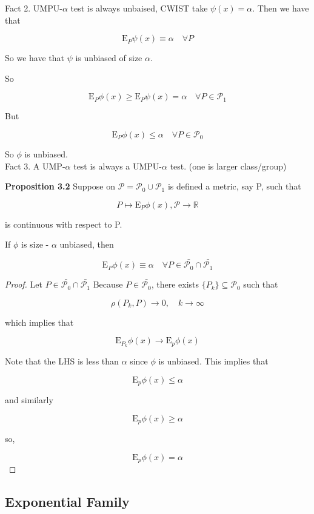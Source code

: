 \documentclass[11pt,fleqn]{book} %
\newcommand{\E}{\mathrm{E}}
\begin{document}
Fact 2. UMPU-$\alpha$ test is always unbaised, CWIST take $\psi(x) = \alpha$. Then we have that 

		$$\E_P \psi(x) \equiv \alpha \quad \forall P $$

So we have that $\psi $ is unbiased of size $\alpha$. 

So 		

		$$\E_P \phi(x) \geq \E_P \psi(x) = \alpha \quad \forall P \in \mathcal{P}_1 $$ 

But 

		$$\E_P \phi(x) \leq \alpha \quad \forall  P \in \mathcal{P}_0$$

So $\phi$ is unbiased. \\


Fact 3. A UMP-$\alpha$ test is always a UMPU-$\alpha$ test. (one is larger class/group)

\textbf{Proposition 3.2} Suppose on $\mathcal{P} = \mathcal{P}_0 \cup \mathcal{P}_1$ is defined a metric, say P, such that

		$$P \mapsto \E_P \phi(x), \mathcal{P} \rightarrow \mathbb{R} $$

is continuous with respect to  P. 

If $\phi$ is size - $\alpha$ unbiased, then

		$$\E_P \phi(x) \equiv \alpha \quad \forall P \in \bar{\mathcal{P}_0} \cap \bar{\mathcal{P}_1} $$

	\begin{proof}
		Let $P \in \bar{\mathcal{P}_0} \cap \bar{\mathcal{P}_1}$ Because $P \in \bar{\mathcal{P}_0}$, there exists $\{P_k\} \subseteq \mathcal{P}_0$ such that

				$$\rho(P_k, P) \rightarrow 0, \quad k \rightarrow \infty $$

		which implies that

				$$\E_{P_k} \phi(x) \rightarrow \E_p \phi(x) $$

		Note that the LHS is less than $\alpha$ since $\phi$ is unbiased. This implies that

				$$ \E_p \phi(x) \leq \alpha$$

		and similarly

				$$\E_p \phi(x) \geq \alpha $$

		so, 

				$$ \E_p \phi(x) = \alpha$$
	\end{proof}

	\subsection{Exponential Family}
\end{document}
